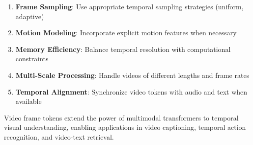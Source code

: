 \begin{enumerate}
\item \textbf{Frame Sampling}: Use appropriate temporal sampling strategies (uniform, adaptive)
\item \textbf{Motion Modeling}: Incorporate explicit motion features when necessary
\item \textbf{Memory Efficiency}: Balance temporal resolution with computational constraints
\item \textbf{Multi-Scale Processing}: Handle videos of different lengths and frame rates
\item \textbf{Temporal Alignment}: Synchronize video tokens with audio and text when available
\end{enumerate}
\begin{comment}
Feedback: This list is good, but could be more actionable.
1.  **Frame Sampling**: "Start with a simple uniform sampling of frames (e.g., 16 or 32 frames per video). If your task requires detecting very brief events, you may need to increase the sampling rate or use a more sophisticated adaptive sampling method."
2.  **Motion Modeling**: "While transformers can learn motion implicitly, for action recognition tasks, consider pre-processing videos to extract optical flow and feeding this as a separate channel or token type. This can provide a strong inductive bias for motion."
3.  **Memory Efficiency**: "To manage memory, aggressively downsample the spatial resolution of your frames (e.g., to 224x224) before feeding them to the encoder. Most of the important information for many tasks is in the motion, not the fine-grained spatial detail."
\end{comment}

Video frame tokens extend the power of multimodal transformers to temporal visual understanding, enabling applications in video captioning, temporal action recognition, and video-text retrieval.
